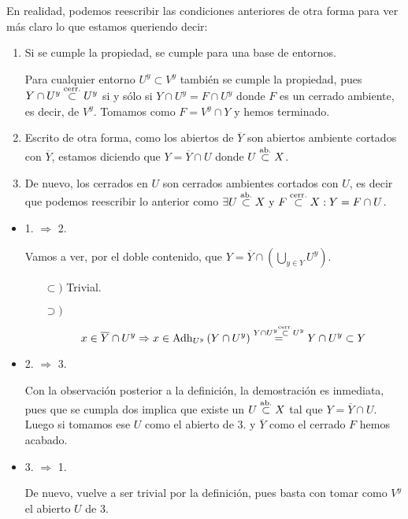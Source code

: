 \begin{obs}
En realidad, podemos reescribir las condiciones anteriores de otra forma para ver más claro lo que estamos queriendo decir:
\begin{enumerate}
\item Si se cumple la propiedad, se cumple para una base de entornos.

Para cualquier entorno $U^y \subset V^y$ también se cumple la propiedad, pues $Y\cap U^y \stackrel{\text{cerr.}}{\subset} U^y$ si y sólo si $Y\cap U^y = F \cap U^y$ donde $F$ es un cerrado ambiente, es decir, de $V^y$. Tomamos como $F = V^y \cap Y$ y hemos terminado. 

\item Escrito de otra forma, como los abiertos de $\overline{Y}$ son abiertos ambiente cortados con $\overline{Y}$, estamos diciendo que $Y = \overline{Y} \cap U$ donde $U \stackrel{\text{ab.}}{\subset} X$.

\item De nuevo, los cerrados en $U$ son cerrados ambientes cortados con $U$, es decir que podemos reescribir lo anterior como $\exists U \stackrel{\text{ab.}}{\subset} X \mbox{ y } F\stackrel{\text{cerr.}}{\subset} X : Y = F \cap U$.
\end{enumerate}
\end{obs}

\begin{demo}
\begin{itemize}
    \item 1. $\Rightarrow$ 2.
    
    Vamos a ver, por el doble contenido, que $Y = \overline{Y} \cap \left( \bigcup_{y \in Y} U^y \right)$.
    \begin{itemize}
        \item[$\subset)$] Trivial.
        \item[$\supset)$]
        \[
       	x\in \overline{Y} \cap U^y \Rightarrow x \in \operatorname{Adh}_{U^y} \left( Y \cap U^y \right) \stackrel{Y \cap U^y \stackrel{\text{cerr.}}{\subset} U^y}{=} Y \cap U^y \subset Y
       	\]
    \end{itemize}
    \item 2. $\Rightarrow$ 3.
	
	Con la observación posterior a la definición, la demostración es inmediata, pues que se cumpla dos implica que existe un $U \stackrel{\text{ab.}}{\subset} X$ tal que $Y = \overline{Y} \cap U$. Luego si tomamos ese $U$ como el abierto de 3. y $\overline{Y}$ como el cerrado $F$ hemos acabado.
	
    \item 3. $\Rightarrow$ 1.
    
    De nuevo, vuelve a ser trivial por la definición, pues basta con tomar como $V^y$ el abierto $U$ de 3.
\end{itemize}
\end{demo}

